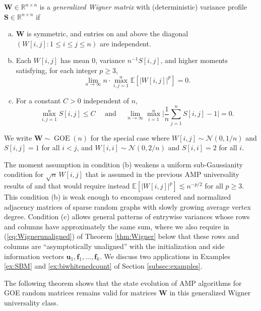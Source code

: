 \documentclass[10pt,reqno]{amsart}
\def\u{\mathbf{u}}
\def\f{\mathbf{f}}
\def\W{\mathbf{W}}
\def\S{\mathbf{S}}
\def\E{\mathbb{E}}
\def\R{\mathbb{R}}
\def\Normal{\mathcal{N}}
\def\GOE{\operatorname{GOE}}
\begin{document}
\begin{definition}\label{def:Wigner}
$\W \in \R^{n \times n}$ is a \emph{generalized Wigner matrix} with
(deterministic) variance profile $\S \in \R^{n \times n}$ if
\begin{enumerate}[(a)]
\item $\W$ is symmetric, and entries on and above the diagonal
$(W[i,j]: 1 \leq i \leq j \leq n)$ are independent.
\label{assump:Wigner:Wind}
% 
\item Each $W[i,j]$ has mean 0, variance $n^{-1}S[i,j]$, and higher
moments satisfying, for each integer $p \geq 3$,
\[\lim_{n \to \infty} n\cdot \max_{i,j=1}^n \E[|W[i,j]|^p]=0.\]
\label{assump:Wigner:Wmoment}
% 
\item For a constant $C>0$ independent of $n$,
\[\max_{i,j=1}^n S[i,j] \leq C \quad \text{ and } \quad
\lim_{n \to \infty} \max_{i=1}^n \bigg|\frac{1}{n}\sum_{j=1}^n
S[i,j]-1\bigg|=0.\]
\label{assump:Wigner:S}
\end{enumerate}
We write $\W \sim \GOE(n)$ for the special case where
$W[i,j] \sim \Normal(0,1/n)$ and $S[i,j]=1$ for all $i<j$,
and $W[i,i] \sim \Normal(0,2/n)$ and $S[i,i]=2$ for all $i$.
\end{definition}

The moment assumption in condition (b) weakens a uniform sub-Gaussianity
condition for $\sqrt{n}\,W[i,j]$ that is assumed in the previous AMP universality
results of \cite{bayati2015universality,chen2021universality} and that would
require instead $\E[|W[i,j]|^p] \lesssim n^{-p/2}$ for all $p \geq 3$.
This condition (b) is weak enough to encompass centered
and normalized adjacency matrices of sparse random graphs with slowly growing
average vertex degree. Condition (c) allows general patterns of entrywise
variances whose rows and columns have approximately the same sum, where we also
require in (\ref{eq:Wignerunaligned}) of Theorem \ref{thm:Wigner} below that
these rows and columns are ``asymptotically unaligned'' with the
initialization and side information vectors $\u_1,\f_1,\ldots,\f_k$.
We discuss two applications in Examples \ref{ex:SBM} and
\ref{ex:biwhitenedcount} of Section \ref{subsec:examples}.

The following theorem shows that the state evolution of AMP algorithms
for GOE random matrices remains valid for matrices $\W$ in this generalized
Wigner universality class.
\end{document}
